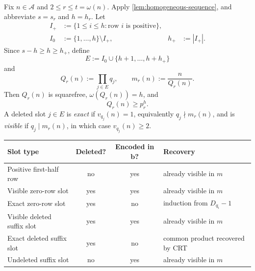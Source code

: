 \documentclass[11pt]{amsart}
\theoremstyle{definition}
\theoremstyle{remark}
\numberwithin{equation}{section}
\newcommand{\Acal}{\mathcal A}
\begin{document}
Fix $n\in\Acal$ and $2\le r\le t=\omega(n)$.  Apply
\cref{lem:homogeneous-sequence}, and abbreviate $s=s_r$ and $h=h_r$.
Let
\begin{align*}
 I_+&:=\{1\le i\le h:\text{row }i\text{ is positive}\},\\
 I_0&:=\{1,\ldots,h\}\setminus I_+,
 & h_+&:=|I_+|.
\end{align*}
Since $s-h\ge h\ge h_+$, define
\begin{equation}\label{eq:deleted-slots}
 E:=I_0\cup\{h+1,\ldots,h+h_+\}
\end{equation}
and
\begin{equation}\label{eq:Qr-def}
 Q_r(n):=\prod_{j\in E}q_j,
 \qquad m_r(n):=\frac{n}{Q_r(n)}.
\end{equation}
Then $Q_r(n)$ is squarefree, $\omega(Q_r(n))=h$, and
\begin{equation}\label{eq:Qr-lower}
 Q_r(n)\ge p_r^h.
\end{equation}
A deleted slot $j\in E$ is \emph{exact} if $v_{q_j}(n)=1$, equivalently
$q_j\nmid m_r(n)$, and is \emph{visible} if $q_j\mid m_r(n)$, in which
case $v_{q_j}(n)\ge2$.

\begin{center}
\small
\begin{tabular}{@{}p{}ccp{}@{}}
\toprule
Slot type & Deleted? & Encoded in $\mathbf b$? & Recovery \\
\midrule
Positive first-half row & no & yes & already visible in $m$ \\
Visible zero-row slot & yes & yes & already visible in $m$ \\
Exact zero-row slot & yes & no & induction from $D_{q_i}-1$ \\
Visible deleted suffix slot & yes & yes & already visible in $m$ \\
Exact deleted suffix slot & yes & no & common product recovered by CRT \\
Undeleted suffix slot & no & yes & already visible in $m$ \\
\bottomrule
\end{tabular}
\normalsize
\end{center}
\end{document}
